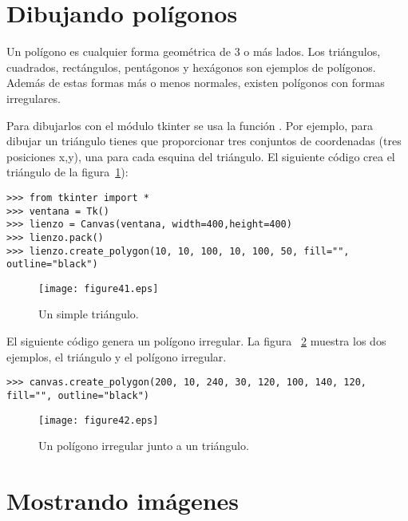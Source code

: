 \section{Dibujando polígonos}

Un polígono es cualquier forma geométrica de 3 o más lados. Los triángulos, cuadrados, rectángulos, pentágonos y hexágonos son ejemplos de polígonos.  Además de estas formas más o menos normales, existen polígonos con formas irregulares.

Para dibujarlos con el módulo tkinter se usa la función . Por ejemplo, para dibujar un triángulo tienes que proporcionar tres conjuntos de coordenadas (tres posiciones x,y), una para cada esquina del triángulo. El siguiente código crea el triángulo de la figura~\ref{fig41}):

\begin{listing}
\begin{verbatim}
>>> from tkinter import *
>>> ventana = Tk()
>>> lienzo = Canvas(ventana, width=400,height=400)
>>> lienzo.pack()
>>> lienzo.create_polygon(10, 10, 100, 10, 100, 50, fill="", outline="black")
\end{verbatim}
\end{listing}

\begin{figure}
\begin{center}
\texttt{[image: figure41.eps]}
\end{center}
\caption{Un simple triángulo.}\label{fig41}
\end{figure}

El siguiente código genera un polígono irregular. La figura ~\ref{fig42} muestra los dos ejemplos, el triángulo y el polígono irregular.

\begin{listing}
\begin{verbatim}
>>> canvas.create_polygon(200, 10, 240, 30, 120, 100, 140, 120, fill="", outline="black")
\end{verbatim}
\end{listing}

\begin{figure}
\begin{center}
\texttt{[image: figure42.eps]}
\end{center}
\caption{Un polígono irregular junto a un triángulo.}\label{fig42}
\end{figure}

\section{Mostrando imágenes}

